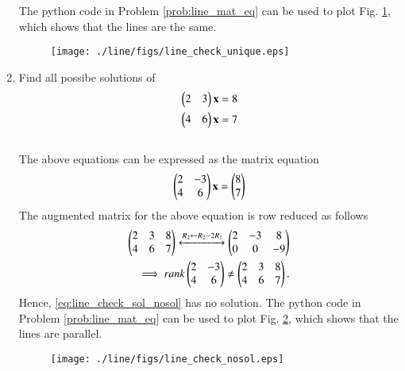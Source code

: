 \begin{enumerate}[label=\arabic*.,ref=\thesubsection.\theenumi]
The python code in Problem \ref{prob:line_mat_eq}
%
%
can be used to plot Fig. \ref{fig:line_check_sol_unique}, which shows that the lines are the same.
%
\begin{figure}[!ht]
\texttt{[image: ./line/figs/line\_check\_unique.eps]}
\caption{}
\label{fig:line_check_sol_unique}
\end{figure}
%
\item Find all possibe solutions of
\begin{align}
\label{eq:line_check_sol_nosol}
\begin{split}
\begin{pmatrix}2 & 3 \end{pmatrix}\mathbf{x}&=8
\\
\begin{pmatrix}4 & 6 \end{pmatrix}\mathbf{x}&=7
\end{split}
\end{align}
%
\\
\solution The above equations can be expressed as the matrix equation
\begin{align}
\begin{pmatrix}2 & -3\\4 & 6\end{pmatrix} \mathbf{x} = \begin{pmatrix}8\\ 7\end{pmatrix}
\end{align}
%
The augmented matrix for the above equation is row reduced as follows
\begin{align}
\begin{pmatrix}2 & 3 & 8\\4 &  6 & 7\end{pmatrix} 
\xleftrightarrow {R_2\leftarrow R_2-2R_1}\begin{pmatrix}2 & -3 & 8\\0 &  0 & -9\end{pmatrix} 
\\
\implies rank \begin{pmatrix}2 & -3\\4 & 6\end{pmatrix} \ne \begin{pmatrix}2 & 3 & 8\\4 &  6 & 7\end{pmatrix}. 
\end{align}
%
Hence, \eqref{eq:line_check_sol_nosol} has no solution.
The python code in Problem \ref{prob:line_mat_eq}
%
%
can be used to plot Fig. \ref{fig:line_check_nosol}, which shows that the lines are parallel.
%
\begin{figure}[!ht]
\texttt{[image: ./line/figs/line\_check\_nosol.eps]}
\caption{}
\label{fig:line_check_nosol}
\end{figure}


\end{enumerate}
